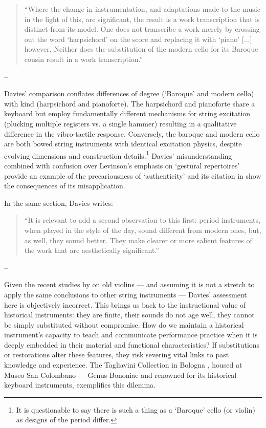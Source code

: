 \begin{quotation}
    ``Where the change in instrumentation, and adaptations made to the music in the light of this, are significant, the result is a work transcription that is distinct from its model. One does not transcribe a work merely by crossing out the word ‘harpsichord’ on the score and replacing it with ‘piano’ [...] however. Neither does the substitution of the modern cello for its Baroque cousin result in a work transcription.''
\end{quotation}
\begin{flushright}
-- \cite[p. 222]{davies_authenticity_2001}
\end{flushright}

Davies' comparison conflates differences of degree (`Baroque' and modern cello) with kind (harpsichord and pianoforte). The harpsichord and pianoforte share a keyboard but employ fundamentally different mechanisms for string excitation (plucking multiple registers vs. a single hammer) resulting in a qualitative difference in the vibro-tactile response. Conversely, the baroque and modern cello are both bowed string instruments with identical excitation physics, despite evolving dimensions and construction details.\footnote{It is questionable to say there is such a thing as a `Baroque' cello (or violin) as designs of the period differ.} Davies' misunderstanding combined with confusion over Levinson's emphasis on `gestural repertoires' \cite{levinson_music_1990} provide an example of the precariousness of `authenticity' and its citation in \textcite{laurenson_authenticity_2006} show the consequences of its misapplication.

In the same section, Davies writes:

\begin{quotation}
``It is relevant to add a second observation to this first: period instruments, when played in the style of the day, sound different from modern ones, but, as well, they sound better. They make clearer or more salient features of the work that are aesthetically significant.''
\end{quotation}
\begin{flushright}
-- \cite[p. 218]{davies_authenticity_2001}
\end{flushright}

Given the recent studies by \textcite{fritz_player_2012, fritz_soloist_2014, fritz_listener_2017} on old violins --- and assuming it is not a stretch to apply the same conclusions to other string instruments --- Davies' assessment here is objectively incorrect.
This brings us back to the instructional value of historical instruments: they are finite, their sounds do not age well, they cannot be simply substituted without compromise. How do we maintain a historical instrument's capacity to teach and communicate performance practice when it is deeply embedded in their material and functional characteristics? If substitutions or restorations alter these features, they risk severing vital links to past knowledge and experience. The Tagliavini Collection in Bologna \cite{tagliavini_clavicembali_1987}, housed at Museo San Colombano --- Genus Bononiae and renowned for its historical keyboard instruments, exemplifies this dilemma.

